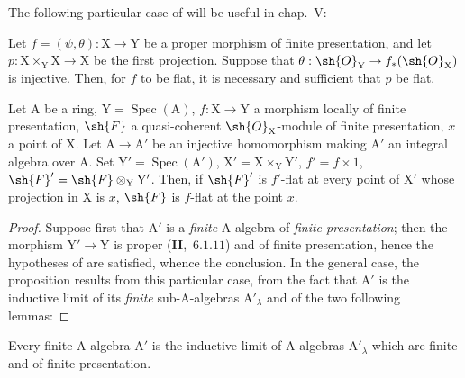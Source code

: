 The following particular case of  will be useful in chap.~V:

\begin{corollary}[11.5.4]
\label{IV.11.5.4}
Let $f=(\psi,\theta):\mathrm{X}\to\mathrm{Y}$ be a proper morphism of finite presentation,
and let $p:\mathrm{X}\times_\mathrm{Y}\mathrm{X}\to\mathrm{X}$ be the first projection. Suppose that $\theta:\sh{O}_\mathrm{Y}\to f_*(\sh{O}_\mathrm{X})$ is injective.
Then, for $f$ to be flat, it is necessary and sufficient that $p$ be flat.
\end{corollary}

\begin{proposition}[11.5.5]
\label{IV.11.5.5}
Let $\mathrm{A}$ be a ring, $\mathrm{Y}=\operatorname{Spec}(\mathrm{A})$, $f:\mathrm{X}\to\mathrm{Y}$ a morphism
locally of finite presentation, $\sh{F}$ a quasi-coherent $\sh{O}_\mathrm{X}$-module of finite presentation, $x$ a point
of $\mathrm{X}$. Let $\mathrm{A}\to\mathrm{A}'$ be an injective homomorphism making $\mathrm{A}'$ an integral algebra over $\mathrm{A}$. Set
$\mathrm{Y}'=\operatorname{Spec}(\mathrm{A}')$, $\mathrm{X}'=\mathrm{X}\times_\mathrm{Y}\mathrm{Y}'$, $f'=f\times 1$, $\sh{F}'=\sh{F}\otimes_\mathrm{Y}\mathrm{Y}'$. Then, if $\sh{F}'$ is $f'$-flat at every point
of $\mathrm{X}'$ whose projection in $\mathrm{X}$ is $x$, $\sh{F}$ is $f$-flat at the point $x$.
\end{proposition}

\begin{proof}
Suppose first that $\mathrm{A}'$ is a \emph{finite} $\mathrm{A}$-algebra of \emph{finite presentation}; then the
morphism $\mathrm{Y}'\to\mathrm{Y}$ is proper (\textbf{II},~$6.1.11$) and of finite presentation, hence the hypotheses
of  are satisfied, whence the conclusion. In the general case, the proposition results
from this particular case, from the fact that $\mathrm{A}'$ is the inductive limit of its \emph{finite} sub-$\mathrm{A}$-algebras
$\mathrm{A}'_\lambda$ and of the two following lemmas:
\end{proof}

\begin{lemma}[11.5.5.1]
\label{IV.11.5.5.1}
Every finite $\mathrm{A}$-algebra $\mathrm{A}'$ is the inductive limit of $\mathrm{A}$-algebras $\mathrm{A}'_\lambda$
which are finite and of finite presentation.
\end{lemma}

